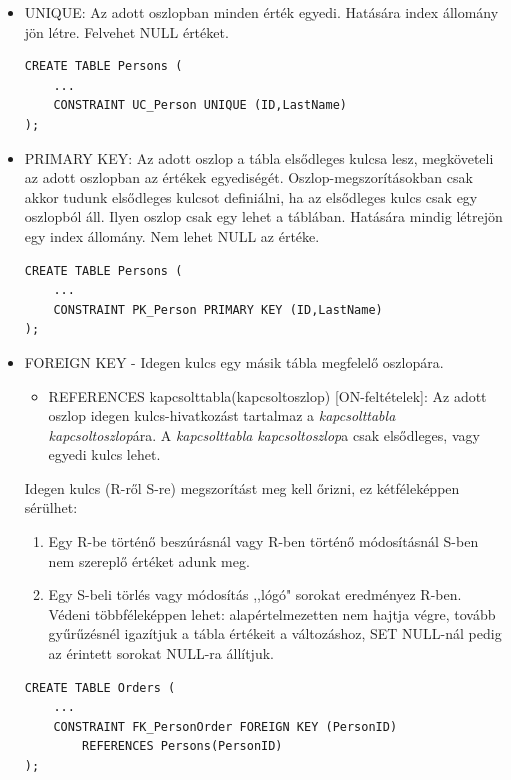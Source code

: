 \documentclass[tikz,12pt,margin=0px]{article}
\begin{document}
    \begin{itemize}
        \item UNIQUE: Az adott oszlopban minden érték egyedi. Hatására index állomány jön létre. Felvehet NULL értéket.
        {\small
        \begin{verbatim}
CREATE TABLE Persons (
    ...
    CONSTRAINT UC_Person UNIQUE (ID,LastName)
);
        \end{verbatim}
        }
            \item PRIMARY KEY: Az adott oszlop a tábla elsődleges kulcsa lesz, megköveteli az adott oszlopban az értékek egyediségét. Oszlop-megszorításokban csak akkor tudunk elsődleges kulcsot definiálni, ha az elsődleges kulcs csak egy oszlopból áll. Ilyen oszlop csak egy lehet a táblában. Hatására mindig létrejön egy index állomány. Nem lehet NULL az értéke.
            {\small
            \begin{verbatim}
CREATE TABLE Persons (
    ...
    CONSTRAINT PK_Person PRIMARY KEY (ID,LastName)
);
            \end{verbatim}
            }
            \item FOREIGN KEY - Idegen kulcs egy másik tábla megfelelő oszlopára.
            \begin{itemize}
                \item REFERENCES kapcsolttabla(kapcsoltoszlop) [ON-feltételek]: Az adott oszlop idegen kulcs-hivatkozást tartalmaz a \emph{kapcsolttabla} \emph{kapcsoltoszlop}ára. A \emph{kapcsolttabla} \emph{kapcsoltoszlop}a csak elsődleges, vagy egyedi kulcs lehet.
            \end{itemize}
            Idegen kulcs (R-ről S-re) megszorítást meg kell őrizni, ez kétféleképpen sérülhet:
            \begin{enumerate}
                \item Egy R-be történő beszúrásnál vagy R-ben történő módosításnál S-ben nem szereplő értéket adunk meg.
                \item Egy S-beli törlés vagy módosítás ,,lógó" sorokat eredményez R-ben. Védeni többféleképpen lehet: alapértelmezetten nem hajtja végre, tovább gyűrűzésnél igazítjuk a tábla értékeit a változáshoz, SET NULL-nál pedig az érintett sorokat NULL-ra állítjuk.
            \end{enumerate}
            {\small
            \begin{verbatim}
CREATE TABLE Orders (
    ...
    CONSTRAINT FK_PersonOrder FOREIGN KEY (PersonID)
        REFERENCES Persons(PersonID)
);
            \end{verbatim}
}
\end{itemize}
\end{document}

